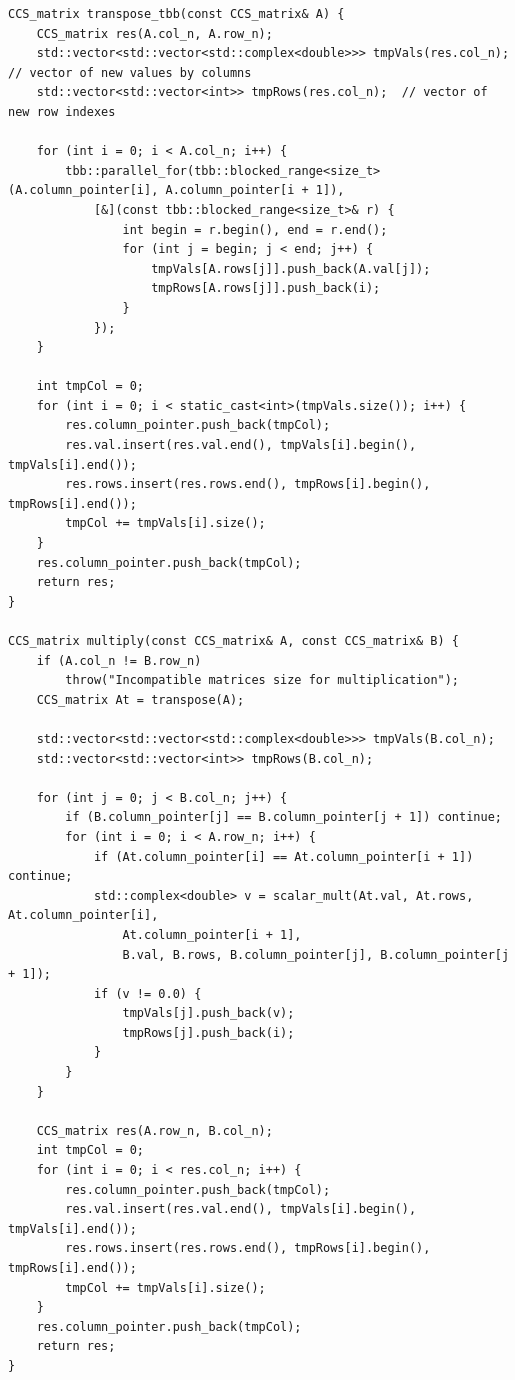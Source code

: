 \documentclass{report}
\begin{document}
\begin{lstlisting}
CCS_matrix transpose_tbb(const CCS_matrix& A) {
    CCS_matrix res(A.col_n, A.row_n);
    std::vector<std::vector<std::complex<double>>> tmpVals(res.col_n);  // vector of new values by columns
    std::vector<std::vector<int>> tmpRows(res.col_n);  // vector of new row indexes

    for (int i = 0; i < A.col_n; i++) {
        tbb::parallel_for(tbb::blocked_range<size_t>(A.column_pointer[i], A.column_pointer[i + 1]),
            [&](const tbb::blocked_range<size_t>& r) {
                int begin = r.begin(), end = r.end();
                for (int j = begin; j < end; j++) {
                    tmpVals[A.rows[j]].push_back(A.val[j]);
                    tmpRows[A.rows[j]].push_back(i);
                }
            });
    }

    int tmpCol = 0;
    for (int i = 0; i < static_cast<int>(tmpVals.size()); i++) {
        res.column_pointer.push_back(tmpCol);
        res.val.insert(res.val.end(), tmpVals[i].begin(), tmpVals[i].end());
        res.rows.insert(res.rows.end(), tmpRows[i].begin(), tmpRows[i].end());
        tmpCol += tmpVals[i].size();
    }
    res.column_pointer.push_back(tmpCol);
    return res;
}

CCS_matrix multiply(const CCS_matrix& A, const CCS_matrix& B) {
    if (A.col_n != B.row_n)
        throw("Incompatible matrices size for multiplication");
    CCS_matrix At = transpose(A);

    std::vector<std::vector<std::complex<double>>> tmpVals(B.col_n);
    std::vector<std::vector<int>> tmpRows(B.col_n);

    for (int j = 0; j < B.col_n; j++) {
        if (B.column_pointer[j] == B.column_pointer[j + 1]) continue;
        for (int i = 0; i < A.row_n; i++) {
            if (At.column_pointer[i] == At.column_pointer[i + 1]) continue;
            std::complex<double> v = scalar_mult(At.val, At.rows, At.column_pointer[i],
                At.column_pointer[i + 1],
                B.val, B.rows, B.column_pointer[j], B.column_pointer[j + 1]);
            if (v != 0.0) {
                tmpVals[j].push_back(v);
                tmpRows[j].push_back(i);
            }
        }
    }

    CCS_matrix res(A.row_n, B.col_n);
    int tmpCol = 0;
    for (int i = 0; i < res.col_n; i++) {
        res.column_pointer.push_back(tmpCol);
        res.val.insert(res.val.end(), tmpVals[i].begin(), tmpVals[i].end());
        res.rows.insert(res.rows.end(), tmpRows[i].begin(), tmpRows[i].end());
        tmpCol += tmpVals[i].size();
    }
    res.column_pointer.push_back(tmpCol);
    return res;
}


\end{lstlisting}
\end{document}
